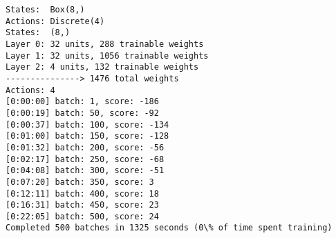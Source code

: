 \documentclass[11pt]{article}
\begin{document}
    \begin{Verbatim}[commandchars=\\\{\}]
States:  Box(8,)
Actions: Discrete(4)
States:  (8,)
Layer 0: 32 units, 288 trainable weights
Layer 1: 32 units, 1056 trainable weights
Layer 2: 4 units, 132 trainable weights
---------------> 1476 total weights
Actions: 4
[0:00:00] batch: 1, score: -186
[0:00:19] batch: 50, score: -92
[0:00:37] batch: 100, score: -134
[0:01:00] batch: 150, score: -128
[0:01:32] batch: 200, score: -56
[0:02:17] batch: 250, score: -68
[0:04:08] batch: 300, score: -51
[0:07:20] batch: 350, score: 3
[0:12:11] batch: 400, score: 18
[0:16:31] batch: 450, score: 23
[0:22:05] batch: 500, score: 24
Completed 500 batches in 1325 seconds (0\% of time spent training)

    \end{Verbatim}
\end{document}
